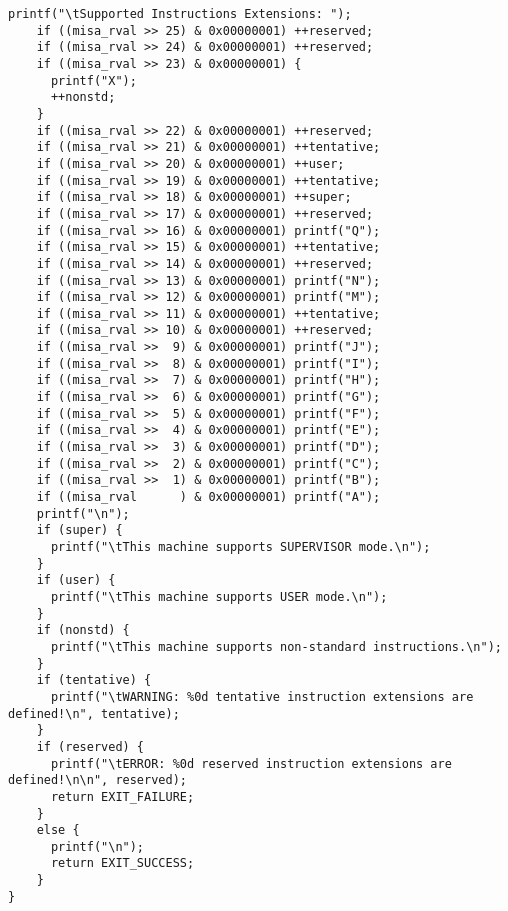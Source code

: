 \begin{lstlisting}[caption={A sample C++ code}, label=lst:sample_code]
    printf("\tSupported Instructions Extensions: ");
    if ((misa_rval >> 25) & 0x00000001) ++reserved;
    if ((misa_rval >> 24) & 0x00000001) ++reserved;
    if ((misa_rval >> 23) & 0x00000001) {
      printf("X");
      ++nonstd;
    }
    if ((misa_rval >> 22) & 0x00000001) ++reserved;
    if ((misa_rval >> 21) & 0x00000001) ++tentative;
    if ((misa_rval >> 20) & 0x00000001) ++user;
    if ((misa_rval >> 19) & 0x00000001) ++tentative;
    if ((misa_rval >> 18) & 0x00000001) ++super;
    if ((misa_rval >> 17) & 0x00000001) ++reserved;
    if ((misa_rval >> 16) & 0x00000001) printf("Q");
    if ((misa_rval >> 15) & 0x00000001) ++tentative;
    if ((misa_rval >> 14) & 0x00000001) ++reserved;
    if ((misa_rval >> 13) & 0x00000001) printf("N");
    if ((misa_rval >> 12) & 0x00000001) printf("M");
    if ((misa_rval >> 11) & 0x00000001) ++tentative;
    if ((misa_rval >> 10) & 0x00000001) ++reserved;
    if ((misa_rval >>  9) & 0x00000001) printf("J");
    if ((misa_rval >>  8) & 0x00000001) printf("I");
    if ((misa_rval >>  7) & 0x00000001) printf("H");
    if ((misa_rval >>  6) & 0x00000001) printf("G");
    if ((misa_rval >>  5) & 0x00000001) printf("F");
    if ((misa_rval >>  4) & 0x00000001) printf("E");
    if ((misa_rval >>  3) & 0x00000001) printf("D");
    if ((misa_rval >>  2) & 0x00000001) printf("C");
    if ((misa_rval >>  1) & 0x00000001) printf("B");
    if ((misa_rval      ) & 0x00000001) printf("A");
    printf("\n");
    if (super) {
      printf("\tThis machine supports SUPERVISOR mode.\n");
    }
    if (user) {
      printf("\tThis machine supports USER mode.\n");
    }
    if (nonstd) {
      printf("\tThis machine supports non-standard instructions.\n");
    }
    if (tentative) {
      printf("\tWARNING: %0d tentative instruction extensions are defined!\n", tentative);
    }
    if (reserved) {
      printf("\tERROR: %0d reserved instruction extensions are defined!\n\n", reserved);
      return EXIT_FAILURE;
    }
    else {
      printf("\n");
      return EXIT_SUCCESS;
    }
}

\end{lstlisting}



